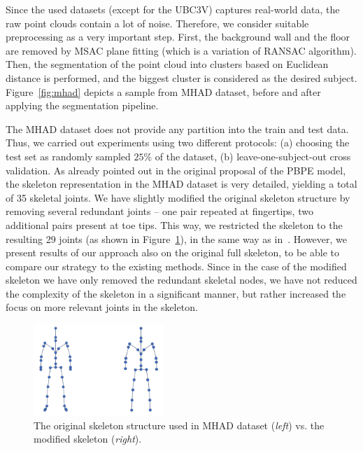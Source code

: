\noindent
Since the used datasets (except for the UBC3V) captures real-world data, the raw point clouds contain a lot of noise. Therefore, we consider suitable preprocessing as a very important step. First, the background wall and the floor are removed by MSAC plane fitting (which is a variation of RANSAC algorithm). Then, the segmentation of the point cloud into clusters based on Euclidean distance is performed, and the biggest cluster is considered as the desired subject. Figure~\ref{fig:mhad} depicts a sample from MHAD dataset, before and after applying the segmentation pipeline.%
\par

\vspace{5mm}
\noindent
The MHAD dataset does not provide any partition into the train and test data. Thus, we carried out experiments using two different protocols: (a) choosing the test set as randomly sampled $25 \%$ of the dataset, (b) leave-one-subject-out cross validation. As already pointed out in the original proposal of the PBPE model, the skeleton representation in the MHAD dataset is very detailed, yielding a total of 35 skeletal joints. We have slightly modified the original skeleton structure by removing several redundant joints – one pair repeated at fingertips, two additional pairs present at toe tips. This way, we restricted the skeleton to the resulting 29 joints (as shown in Figure~\ref{fig:mhad_skeletons}), in the same way as in~\cite{Ali19}. However, we present results of our approach also on the original full skeleton, to be able to compare our strategy to the existing methods. Since in the case of the modified skeleton we have only removed the redundant skeletal nodes, we have not reduced the complexity of the skeleton in a significant manner, but rather increased the focus on more relevant joints in the skeleton.

\vspace{5mm}
\begin{figure}[H]
\begin{center}
  \includegraphics[height=130px]{images/implementation/mhad_skeletons.png}
  \caption[The MHAD dataset skeleton before vs. after modification.]{The original skeleton structure used in MHAD dataset ({\it left}) vs. the modified skeleton ({\it right}).}
  \label{fig:mhad_skeletons}
\end{center}
\end{figure}

